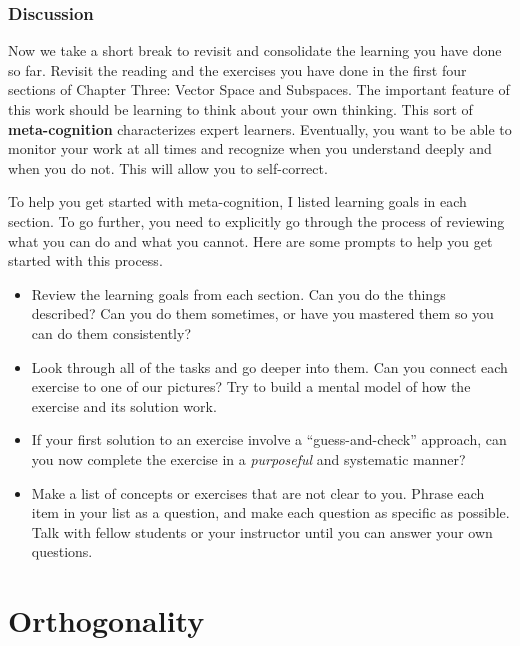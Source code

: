 \documentclass[10pt,]{book}
\newcommand{\terminology}[1]{\textbf{#1}}
\theoremstyle{plain}
\theoremstyle{definition}
\numberwithin{equation}{section}
\begin{document}
\subsection[Discussion]{Discussion}\label{subsection-91}
Now we take a short break to revisit and consolidate the learning you
      have done so far. Revisit the reading and the exercises you have done in
      the first four sections of Chapter Three: Vector Space and Subspaces. The
      important feature of this work should be
      learning to think about your own thinking. This sort of \terminology{meta-cognition}
      characterizes expert learners. Eventually, you want to be able to monitor
      your work at all times and recognize when you understand deeply and when
      you do not. This will allow you to self-correct.
\par
To help you get started with meta-cognition, I listed learning goals in
      each section. To go further, you need to explicitly go through the process
      of reviewing what you can do and what you cannot. Here are some prompts to
      help you get started with this process.
      \begin{itemize}
\item{}
          Review the learning goals from each section. Can you do the things
          described? Can you do them sometimes, or have you mastered them so you
          can do them consistently?
        \item{}
          Look through all of the tasks and go deeper into them. Can you
          connect each exercise to one of our pictures? Try to build a mental
          model of how the exercise and its solution work.
        \item{}
          If your first solution to an exercise involve a ``guess-and-check''
          approach, can you now complete the exercise in a \emph{purposeful}
          and systematic manner?
        \item{}
          Make a list of concepts or exercises that are not clear to you. Phrase
          each item in your list as a question, and make each question as
          specific as possible. Talk with fellow students or your
          instructor until you can answer your own questions.
        \end{itemize}

\clearpage
\typeout{************************************************}
\typeout{************************************************}
\chapter[Orthogonality]{Orthogonality}\label{chapter-orthogonality}
\end{document}

